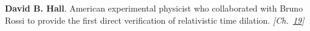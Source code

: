 \textbf{David B. Hall}. American experimental physicist who collaborated with Bruno Rossi to provide the first direct verification of relativistic time dilation. \emph{[Ch.~\hyperref[ch:cosmicraymuons]{19}]}

